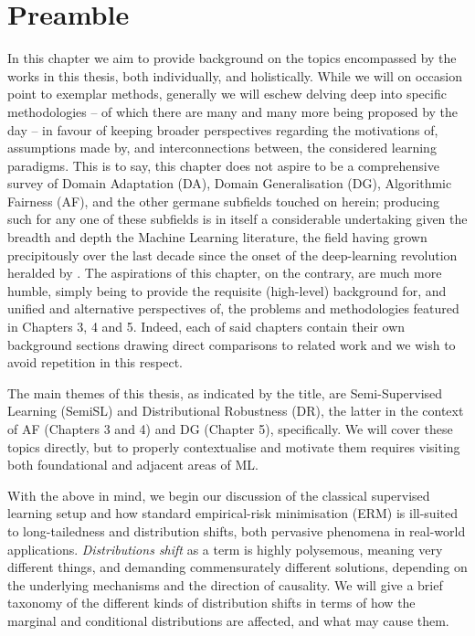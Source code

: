\section*{Preamble}
\noindent
%
In this chapter we aim to provide background on the topics encompassed by the works in this thesis,
both individually, and holistically.
%
While we will on occasion point to exemplar methods, generally we will eschew delving deep into
specific methodologies -- of which there are many and many more being proposed by the day -- in
favour of keeping broader perspectives regarding the motivations of, assumptions made by, and
interconnections between, the considered learning paradigms. 
%
This is to say, this chapter does not aspire to be a comprehensive survey of Domain Adaptation
(DA), Domain Generalisation (DG), Algorithmic Fairness (AF), and the other germane subfields
touched on herein; producing such for any one of these subfields is in itself a considerable
undertaking given the breadth and depth the Machine Learning literature, the field having grown
precipitously over the last decade since the onset of the deep-learning revolution heralded by
\cite{krizhevsky2012imagenet}.
%
The aspirations of this chapter, on the contrary, are much more humble, simply being to provide the
requisite (high-level) background for, and unified and alternative perspectives of, the problems
and methodologies featured in Chapters 3, 4 and 5.
%
Indeed, each of said chapters contain their own background sections drawing direct comparisons to
related work and we wish to avoid repetition in this respect.

The main themes of this thesis, as indicated by the title, are Semi-Supervised Learning (SemiSL)
and Distributional Robustness (DR), the latter in the context of AF (Chapters 3 and 4) and DG
(Chapter 5), specifically. 
%
We will cover these topics directly, but to properly contextualise and motivate them requires
visiting both foundational and adjacent areas of ML.

%
With the above in mind, we begin our discussion of the classical supervised learning setup and how
standard empirical-risk minimisation (ERM) is ill-suited to long-tailedness and distribution shifts,
both pervasive phenomena in real-world applications. \emph{Distributions shift} as a term is highly
polysemous, meaning very different things, and demanding commensurately different solutions,
depending on the underlying mechanisms and the direction of causality. We will give a brief
taxonomy of the different kinds of distribution shifts in terms of how the marginal and conditional
distributions are affected, and what may cause them. 


